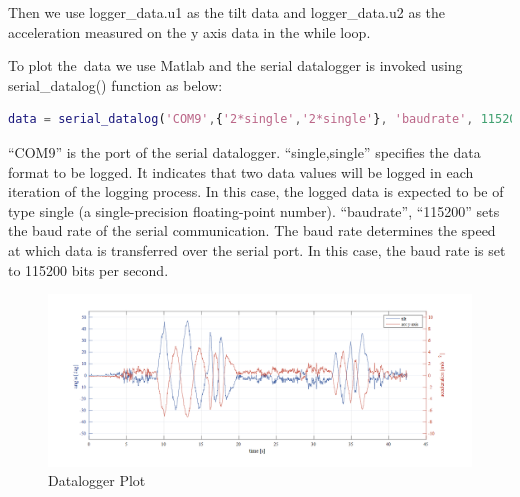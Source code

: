 \documentclass[english]{article}
\begin{document}
Then we use logger\_data.u1 as the tilt data and logger\_data.u2 as the acceleration
measured on the y axis data in the while loop. 
\newline

To plot the\ data we use Matlab and the serial datalogger is invoked using serial\_datalog()
 function as below: 
\begin{lstlisting}[language=Matlab, caption={}, label={lst:datalog} ]
data = serial_datalog('COM9',{'2*single','2*single'}, 'baudrate', 115200)
\end{lstlisting}
“COM9” is the port of the serial datalogger. “single,single” specifies the data 
format to be logged. It indicates that two data values will be logged in each 
iteration of the logging process. In this case, the logged data is expected to be
of type single (a single-precision floating-point number).\newline  
“baudrate”, “115200” sets the baud rate of the serial communication. 
The baud rate determines the speed at which data is transferred over the serial port.
 In this case, the baud rate is set to 115200 bits per second. 
 \begin{figure}[!h]
    \centering
    \includegraphics[width=1.0\textwidth, height=0.35\textheight]{figures/plot.png}
    \caption{Datalogger Plot}
    \label{fig:datal}
\end{figure}
\end{document}
